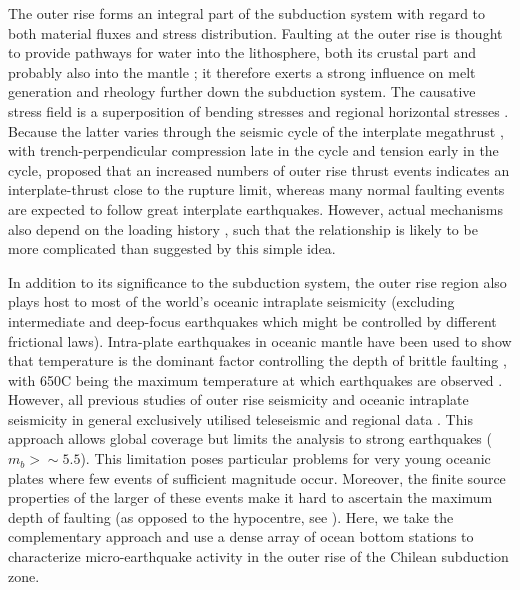 \documentclass[reviewcopy]{elsarticle}
\begin{document}
The outer rise forms an integral part of the subduction system with
regard to both material fluxes and stress distribution. Faulting at
the outer rise is thought to provide pathways for water into the
lithosphere, both its crustal part \citep{kirby96} and probably also
into the mantle  \citep{ranero03}; it therefore exerts a strong
influence on melt generation and rheology further down the subduction
system.  The causative stress field is a superposition of bending
stresses and regional horizontal stresses \citep{christensen88}.
Because the latter varies through the seismic cycle of the interplate
megathrust \citep[e.g.][]{taylor96}, with trench-perpendicular
compression late in the cycle and tension early in the cycle,
\citet{christensen88} proposed that an
increased numbers of outer rise thrust events indicates an
interplate-thrust close to the rupture limit, whereas many normal faulting events
are expected to follow great interplate earthquakes. However, actual
mechanisms also depend on the loading history \citep{mueller96b}, such that the
relationship is likely to be more complicated than suggested by this
simple idea.

In addition to
its significance to the subduction system, the outer rise region also
plays host to most of the world's oceanic intraplate  seismicity
(excluding intermediate and deep-focus earthquakes which might be
controlled by different frictional laws).
Intra-plate earthquakes in oceanic mantle have been used to show that
temperature is the dominant factor controlling the
depth of brittle faulting \citep{wiens83}, with 650\dg C being the
maximum temperature at which earthquakes are observed
\citep{mckenzie05}.
However, all previous studies of outer rise seismicity and oceanic
intraplate seismicity in general exclusively utilised teleseismic and
regional data \citep[e.g.][]{wiens83,christensen88}. This approach allows global
  coverage but limits the analysis to strong earthquakes ($m_b>\sim
  5.5$). This limitation poses particular problems for very young
  oceanic plates where few events of sufficient magnitude
  occur.
Moreover, the finite source properties of the larger of these events
make it hard to ascertain the maximum depth of faulting (as opposed to
the hypocentre, see \citet{tichelaar92}).
Here, we take the complementary approach and use a dense array of
ocean bottom stations to characterize micro-earthquake activity in the
outer rise of the Chilean subduction zone.
\end{document}
